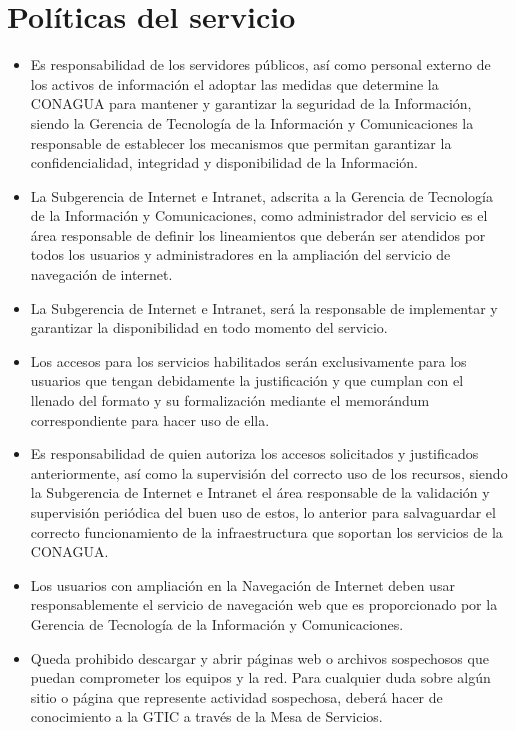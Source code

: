 \documentclass[letterpaper,9pt]{article}
\begin{document}
\section*{Políticas del servicio}
{\small \begin{itemize}
	        \item 	Es responsabilidad de los servidores públicos, así como personal externo de los activos de información el adoptar las medidas que determine la CONAGUA para mantener y garantizar la seguridad de la Información, siendo la Gerencia de Tecnología de la Información y Comunicaciones la responsable de establecer los mecanismos que permitan garantizar la confidencialidad, integridad y disponibilidad de la Información.
	        \item 	La Subgerencia de Internet e Intranet, adscrita a la Gerencia de Tecnología de la Información y Comunicaciones, como administrador del servicio es el área responsable de definir los lineamientos que deberán ser atendidos por todos los usuarios y administradores en la ampliación del servicio de navegación de internet.
           \item La Subgerencia de Internet e Intranet, será la responsable de implementar y garantizar la disponibilidad en todo momento del servicio.
           \item Los accesos para los servicios habilitados serán exclusivamente para los usuarios que tengan debidamente la justificación y que cumplan con el llenado del formato y su formalización mediante el memorándum correspondiente para hacer uso de ella.
           \item Es responsabilidad de quien autoriza los accesos solicitados y justificados anteriormente, así como la supervisión del correcto uso de los recursos, siendo la Subgerencia de Internet e Intranet el área responsable de la validación y supervisión periódica del buen uso de estos, lo anterior para salvaguardar el correcto funcionamiento de la infraestructura que soportan los servicios de la CONAGUA.
           \item Los usuarios con ampliación en la Navegación de Internet deben usar responsablemente el servicio de navegación web que es proporcionado por la Gerencia de Tecnología de la Información y Comunicaciones.
           \item Queda prohibido descargar y abrir páginas web o archivos sospechosos que puedan comprometer los equipos y la red. Para cualquier duda sobre algún sitio o página que represente actividad sospechosa, deberá hacer de conocimiento a la GTIC a través de la Mesa de Servicios.

\end{itemize}}
\end{document}
